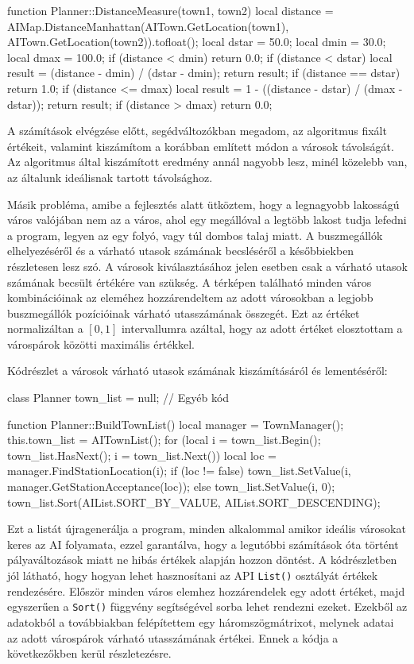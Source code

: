 \begin{cpp}
function Planner::DistanceMeasure(town1, town2)
{
  local distance = AIMap.DistanceManhattan(AITown.GetLocation(town1),
    AITown.GetLocation(town2)).tofloat();
  local dstar = 50.0;
  local dmin = 30.0;
  local dmax = 100.0;
  if (distance < dmin) {
    return 0.0;
  }
  if (distance < dstar) {
    local result = (distance - dmin) / (dstar - dmin);
    return result;
  }
  if (distance == dstar) {
    return 1.0;
  }
  if (distance <= dmax) {
    local result = 1 - ((distance - dstar) / (dmax - dstar));
    return result;
  }
  if (distance > dmax) {
    return 0.0;
  }
}
\end{cpp}
A számítások elvégzése előtt, segédváltozókban megadom, az algoritmus fixált értékeit, valamint kiszámítom a korábban említett módon a városok távolságát. Az algoritmus által kiszámított eredmény annál nagyobb lesz, minél közelebb van, az általunk ideálisnak tartott távolsághoz.

Másik probléma, amibe a fejlesztés alatt ütköztem, hogy a legnagyobb lakosságú város valójában nem az a város, ahol egy megállóval a legtöbb lakost tudja lefedni a program, legyen az egy folyó, vagy túl dombos talaj miatt. A buszmegállók elhelyezéséről és a várható utasok számának becsléséről a későbbiekben részletesen lesz szó. A városok kiválasztásához jelen esetben csak a várható utasok számának becsült értékére van szükség. A térképen található minden város kombinációinak az eleméhez hozzárendeltem az adott városokban a legjobb buszmegállók pozícióinak várható utasszámának összegét. Ezt az értéket normalizáltan a $[0, 1]$ intervallumra azáltal, hogy az adott értéket elosztottam a várospárok közötti maximális értékkel.

Kódrészlet a városok várható utasok számának kiszámításáról és lementéséről:
\begin{cpp}
class Planner {
  town_list = null;
  // Egyéb kód
}

function Planner::BuildTownList()
{
  local manager = TownManager();
  this.town_list = AITownList();
  for (local i = town_list.Begin(); 
    town_list.HasNext(); i = town_list.Next()) {
    local loc = manager.FindStationLocation(i);
    if (loc != false) {
      town_list.SetValue(i, manager.GetStationAcceptance(loc));
    } else {
      town_list.SetValue(i, 0);
    }
  }
  town_list.Sort(AIList.SORT_BY_VALUE, AIList.SORT_DESCENDING);
}
\end{cpp}

Ezt a listát újragenerálja a program, minden alkalommal amikor ideális városokat keres az AI folyamata, ezzel garantálva, hogy a legutóbbi számítások óta történt pályaváltozások miatt ne hibás értékek alapján hozzon döntést. A kódrészletben jól látható, hogy hogyan lehet hasznosítani az API \texttt{List()} osztályát értékek rendezésére. Először minden város elemhez hozzárendelek egy adott értéket, majd egyszerűen a \texttt{Sort()} függvény segítségével sorba lehet rendezni ezeket. Ezekből az adatokból a továbbiakban felépítettem egy háromszögmátrixot, melynek adatai az adott várospárok várható utasszámának értékei. Ennek a kódja a következőkben kerül részletezésre.

